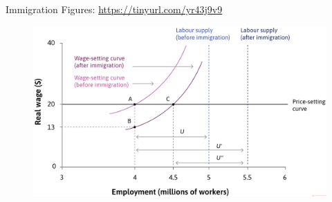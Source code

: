 \documentclass[11pt,aspectratio=43,usenames,dvipsnames]{beamer}
\theoremstyle{definition}
\begin{document}
\begin{frame}{Immigration}
\label{slide:Immigration}
    Figures: \alert{\url{https://tinyurl.com/yr43j9v9}}
    \begin{figure}
        \centering
        \includegraphics[width=\textwidth]{./figures/Immigration.png}
    \end{figure}

\end{frame}
\end{document}
